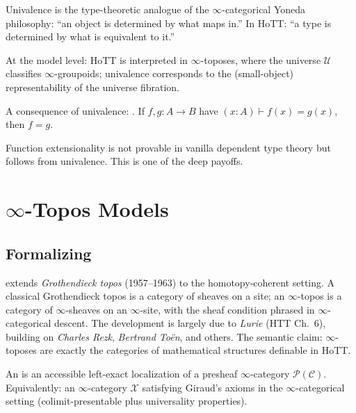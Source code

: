 \begin{remark}
\label{rem:univalence-yoneda}
Univalence is the type-theoretic analogue of the $\infty$-categorical
Yoneda philosophy: ``an object is determined by what maps in.'' In HoTT:
``a type is determined by what is equivalent to it.''

At the model level: HoTT is interpreted in $\infty$-toposes, where the
universe $\mathcal{U}$ classifies $\infty$-groupoids; univalence
corresponds to the (small-object) representability of the universe
fibration.
\end{remark}

\begin{example_thm}
\label{ex:funext}
A consequence of univalence: . If $f, g :
A \to B$ have $(x : A) \vdash f(x) = g(x)$, then $f = g$.

Function extensionality is not provable in vanilla dependent type theory
but follows from univalence. This is one of the deep payoffs.
\end{example_thm}


\section{$\infty$-Topos Models}
\label{sec:infty-topos}

\subsection{Formalizing}

\begin{nameorigin}
 extends \emph{Grothendieck topos} (1957--1963) to
the homotopy-coherent setting. A classical Grothendieck topos is a
category of sheaves on a site; an $\infty$-topos is a category of
$\infty$-sheaves on an $\infty$-site, with the sheaf condition phrased
in $\infty$-categorical descent. The development is largely due to
\emph{Lurie} (HTT Ch.~6), building on \emph{Charles Rezk}, \emph{Bertrand
Toën}, and others. The semantic claim: $\infty$-toposes are exactly
the categories of mathematical structures definable in HoTT.
\end{nameorigin}

\begin{definition}
\label{def:infty-topos}
An  is an accessible left-exact localization of a
presheaf $\infty$-category $\mathcal{P}(\mathcal{C})$. Equivalently:
an $\infty$-category $\mathcal{X}$ satisfying Giraud's axioms in the
$\infty$-categorical setting (colimit-presentable plus universality
properties).
\end{definition}

